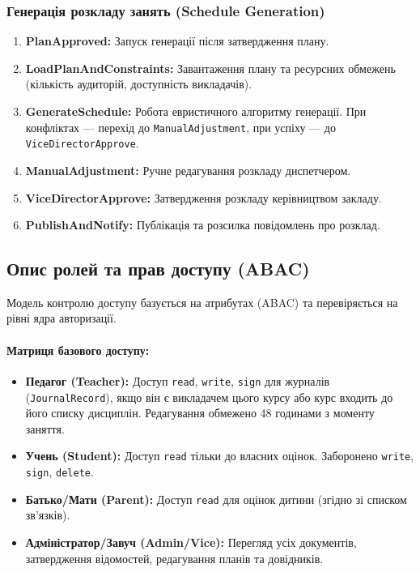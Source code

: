 \documentclass{article}
\begin{document}
\subsubsection{Генерація розкладу занять (Schedule Generation)}
\begin{enumerate}
    \item \textbf{PlanApproved:} Запуск генерації після затвердження плану.
    \item \textbf{LoadPlanAndConstraints:} Завантаження плану та ресурсних обмежень (кількість аудиторій, доступність викладачів).
    \item \textbf{GenerateSchedule:} Робота евристичного алгоритму генерації. При конфліктах --- перехід до \texttt{ManualAdjustment}, при успіху --- до \texttt{ViceDirectorApprove}.
    \item \textbf{ManualAdjustment:} Ручне редагування розкладу диспетчером.
    \item \textbf{ViceDirectorApprove:} Затвердження розкладу керівництвом закладу.
    \item \textbf{PublishAndNotify:} Публікація та розсилка повідомлень про розклад.
\end{enumerate}

\subsection{Опис ролей та прав доступу (ABAC)}
Модель контролю доступу базується на атрибутах (ABAC) та перевіряється на рівні ядра авторизації.

\paragraph{Матриця базового доступу:}
\begin{itemize}
    \item \textbf{Педагог (Teacher):} Доступ \texttt{read}, \texttt{write}, \texttt{sign} для журналів (\texttt{JournalRecord}), якщо він є викладачем цього курсу або курс входить до його списку дисциплін. Редагування обмежено 48 годинами з моменту заняття.
    \item \textbf{Учень (Student):} Доступ \texttt{read} тільки до власних оцінок. Заборонено \texttt{write}, \texttt{sign}, \texttt{delete}.
    \item \textbf{Батько/Мати (Parent):} Доступ \texttt{read} для оцінок дитини (згідно зі списком зв'язків).
    \item \textbf{Адміністратор/Завуч (Admin/Vice):} Перегляд усіх документів, затвердження відомостей, редагування планів та довідників.
\end{itemize}
\end{document}
